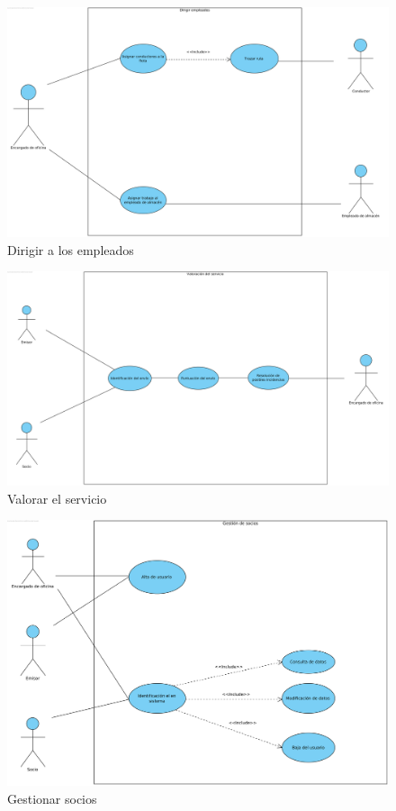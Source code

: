 \documentclass[12pt,spanish]{article}
\begin{document}
\begin{figure}[H]
\centering
\includegraphics[scale=0.5]{dirigir_empleados.png}
\caption{Dirigir a los empleados}
\end{figure}


\begin{figure}[H]
\centering
\includegraphics[scale=0.5]{valorar_servicio.png}
\caption{Valorar el servicio}
\end{figure}

\begin{figure}[H]
\centering
\includegraphics[scale=0.5]{gestion_socios.png}
\caption{Gestionar socios}
\end{figure}
\end{document}
